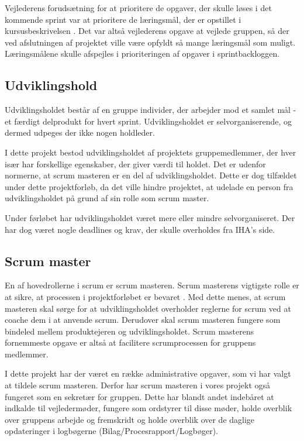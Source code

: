 \noindent Vejlederens forudsætning for at prioritere de opgaver, der skulle løses i det kommende sprint var at prioritere de læringsmål, der er opstillet i kursusbeskrivelsen \cite{laeringsmaal}. Det var altså vejlederens opgave at vejlede gruppen, så der ved afslutningen af projektet ville være opfyldt så mange læringsmål som muligt. Læringsmålene skulle afspejles i prioriteringen af opgaver i sprintbackloggen. 

\subsection{Udviklingshold}
Udviklingsholdet består af en gruppe individer, der arbejder mod et samlet mål - et færdigt delprodukt for hvert sprint. Udviklingsholdet er selvorganiserende, og dermed udpeges der ikke nogen holdleder. \cite{scrumGuides} \newline

\noindent I dette projekt bestod udviklingsholdet af projektets gruppemedlemmer, der hver især har forskellige egenskaber, der giver værdi til holdet. Det er udenfor normerne, at scrum masteren er en del af udviklingsholdet. Dette er dog tilfældet under dette projektforløb, da det ville hindre projektet, at udelade en person fra udviklingsholdet på grund af sin rolle som scrum master. \newline

\noindent Under førløbet har udviklingsholdet været mere eller mindre selvorganiseret. Der har dog været nogle deadlines og krav, der skulle overholdes fra IHA's side.

\subsection{Scrum master}
En af hovedrollerne i scrum er scrum masteren. Scrum masterens vigtigste rolle er at sikre, at processen i projektforløbet er bevaret \cite{scrumGuides}. Med dette menes, at scrum masteren skal sørge for at udviklingsholdet overholder reglerne for scrum ved at coache dem i at anvende scrum. Derudover skal scrum masteren fungere som bindeled mellem produktejeren og udviklingsholdet. Scrum masterens fornemmeste opgave er altså at facilitere scrumprocessen for gruppens medlemmer. \newline

\noindent I dette projekt har der været en række administrative opgaver, som vi har valgt at tildele scrum masteren. Derfor har scrum masteren i vores projekt også fungeret som en sekretær for gruppen. Dette har blandt andet indebåret at indkalde til vejledermøder, fungere som ordstyrer til disse møder, holde overblik over gruppens arbejde og fremskridt og holde overblik over de daglige opdateringer i logbøgerne (Bilag/Procesrapport/Logbøger). \newline

